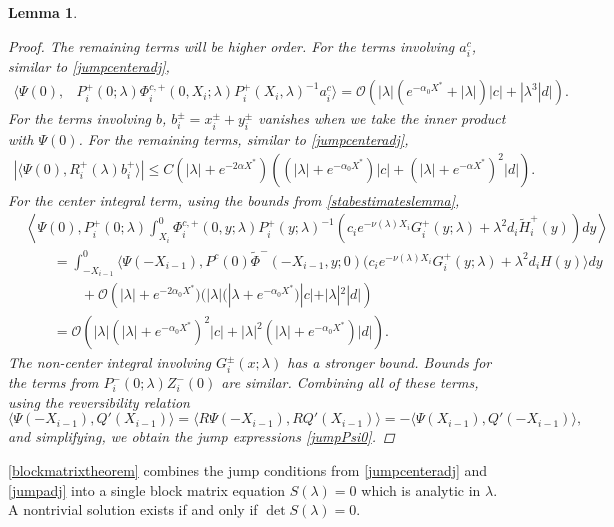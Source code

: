 \documentclass[12pt]{elsarticle}
\theoremstyle{plain}
\newtheorem{lemma}[theorem]{Lemma}
\theoremstyle{definition}
\theoremstyle{remark}
\numberwithin{theorem}{section}
\numberwithin{equation}{section}
\begin{document}
\begin{lemma}
\begin{proof}
The remaining terms will be higher order. For the terms involving $a_i^c$, similar to \cref{jumpcenteradj},
\begin{align*}
\langle \Psi(0), &P_i^+(0; \lambda) \Phi_i^{c,+}(0, X_i; \lambda) P_i^+(X_i, \lambda)^{-1} a_i^c \rangle = \mathcal{O}\left( |\lambda| (e^{-\alpha_0 X^*} + |\lambda|)|c| + |\lambda^3 |d| \right).
\end{align*}
For the terms involving $b$, $b_i^\pm = x_i^\pm + y_i^\pm$ vanishes when we take the inner product with $\Psi(0)$. For the remaining terms, similar to \cref{jumpcenteradj},
\begin{align*}
|\langle \Psi(0), R_i^+(\lambda) b_i^+ \rangle |\leq C \left(|\lambda| + e^{-2 \alpha X^*}\right)\left((|\lambda|+e^{-\alpha_0 X^*})|c| + (|\lambda| + e^{-\alpha X^*})^2 |d| \right).
\end{align*}
For the center integral term, using the bounds from \cref{stabestimateslemma},
\begin{align*}
&\left\langle \Psi(0), P_i^+(0; \lambda) \int_{X_i}^0 \Phi_i^{c,+}(0, y; \lambda) P_i^+(y; \lambda)^{-1}( c_i e^{-\nu(\lambda)X_i} G_i^+(y; \lambda) + \lambda^2 d_i \tilde{H}_i^+(y)) dy \right\rangle \\
&\qquad= \int_{-X_{i-1}}^0 \langle \Psi(-X_{i-1}), P^c(0) \tilde{\Phi}^-(-X_{i-1}, y; 0) 
 (c_i e^{-\nu(\lambda)X_i} G_i^+(y; \lambda) + \lambda^2 d_i H(y) \rangle dy \\
&\qquad\qquad +\mathcal{O}\left( |\lambda| + e^{-2\alpha_0 X^*})(|\lambda|(|\lambda + e^{-\alpha_0 X^*})|c| + |\lambda|^2 |d| \right) \\
&\qquad= \mathcal{O}\left( |\lambda|(|\lambda| + e^{-\alpha_0 X^*})^2|c| + |\lambda|^2 (|\lambda| + e^{-\alpha_0 X^*}) |d| \right).
\end{align*}
The non-center integral involving $G_i^\pm(x; \lambda)$ has a stronger bound. Bounds for the terms from $P_i^-(0; \lambda) Z_i^-(0)$ are similar. Combining all of these terms, using the reversibility relation
\[
\langle \Psi(-X_{i-1}), Q'(X_{i-1}) \rangle = \langle R \Psi(-X_{i-1}), R Q'(X_{i-1}) \rangle = 
-\langle \Psi(X_{i-1}), Q'(-X_{i-1}) \rangle,
\]
and simplifying, we obtain the jump expressions \cref{jumpPsi0}.
\end{proof}
\end{lemma}

\cref{blockmatrixtheorem} combines the jump conditions from \cref{jumpcenteradj} and \cref{jumpadj} into a single block matrix equation $S(\lambda) = 0$ which is analytic in $\lambda$. A nontrivial solution exists if and only if $\det S(\lambda) = 0$.
\end{document}
